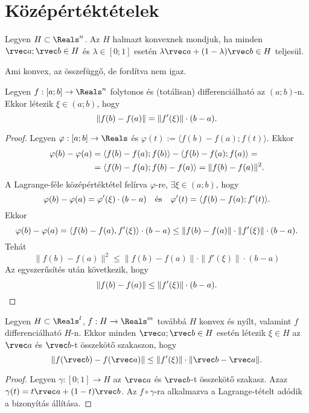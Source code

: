 \clearpage
\section{Középértéktételek}\label{sec-03-03}

\begin{definition}
  Legyen $H \subset \Reals^n$. Az $H$ halmazt konvexnek mondjuk, ha minden
  $\rvec a; \rvec b \in H$ és $\lambda \in [0; 1]$ esetén
  $\lambda \rvec a + (1 - \lambda) \rvec b \in H$ teljesül.
\end{definition}

\begin{note}
  Ami konvex, az összefüggő, de fordítva nem igaz.
\end{note}

\begin{theorem}
  Legyen $f: [a; b] \to \Reals^n$ folytonos és (totálisan) differenciálható
  az $(a; b)$-n. Ekkor létezik $\xi \in (a; b)$, hogy
  $$
    \|f(b) - f(a)\| = \|f'(\xi)\| \cdot (b - a)
    \text.
  $$
  \begin{proof}
    Legyen $\varphi: [a; b] \to \Reals$ és
    $\varphi(t) := \langle f(b) - f(a); f(t) \rangle$. Ekkor
    \begin{align*}
      \varphi(b) - \varphi(a)
       & = \langle f(b) - f(a); f(b) \rangle - \langle f(b) - f(a); f(a) \rangle = \\
       & = \langle f(b) - f(a); f(b) - f(a) \rangle
      = \|f(b) - f(a)\|^2
      \text.
    \end{align*}
    A Lagrange-féle középértéktétel felírva $\varphi$-re,
    $\exists\xi \in (a; b)$, hogy
    $$
      \varphi(b) - \varphi(a) = \varphi'(\xi) \cdot (b - a)
      \quad \text{és} \quad
      \varphi'(t) = \langle f(b) - f(a); f'(t) \rangle
      \text.
    $$
    Ekkor
    $$
      \varphi(b) - \varphi(a) = \langle f(b) - f(a), f'(\xi) \rangle \cdot (b - a)
      \leq
      \|f(b) - f(a)\| \cdot \|f'(\xi)\| \cdot (b - a)
      \text.
    $$
    Tehát
    $$
      \|f(b) - f(a)\|^2 \leq \|f(b) - f(a)\| \cdot \|f'(\xi)\| \cdot (b - a)
    $$
    Az egyszerűsítés után következik, hogy
    $$
      \|f(b) - f(a)\| \leq \|f'(\xi)\| \cdot (b - a)
      \text.
    $$
  \end{proof}
\end{theorem}

\begin{theorem}
  Legyen $H \subset \Reals^l$, $f: H \to \Reals^m$ továbbá $H$ konvex és nyílt,
  valamint $f$ differenciálható $H$-n. Ekkor minden $\rvec a; \rvec b \in H$
  esetén létezik $\xi \in H$ az $\rvec a$ és $\rvec b$-t összekötő szakaszon,
  hogy
  $$
    \|f(\rvec b) - f(\rvec a)\| \leq \|f'(\xi)\| \cdot \|\rvec b - \rvec a\|
    \text.
  $$
  \begin{proof}
    Legyen $\gamma: [0; 1] \to H$ az $\rvec a$ és $\rvec b$-t összekötő szakasz.
    Azaz $\gamma(t) = t \rvec a + (1 - t) \rvec b$. Az $f \circ \gamma$-ra
    alkalmazva a Lagrange-tételt adódik a bizonyítás állítása.
  \end{proof}
\end{theorem}

